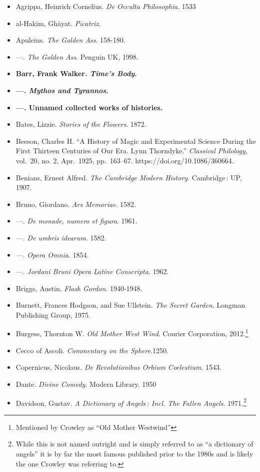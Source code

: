\documentclass[12pt]{article}
\providecommand{\tightlist}{%
  \setlength{\itemsep}{0pt}\setlength{\parskip}{0pt}}
\begin{document}
\begin{itemize}
\tightlist
\item
  Agrippa, Heinrich Cornelius. \emph{De Occulta Philosophia}. 1533
\item
  al-Hakīm, Ghāyat. \emph{Picatrix}.
\item
  Apuleius. \emph{The Golden Ass}. 158-180.
\item
  ---. \emph{The Golden Ass}. Penguin UK, 1998.
\item
  \textbf{Barr, Frank Walker. \emph{Time's Body}.}
\item
  \textbf{---. \emph{Mythos and Tyrannos}.}
\item
  \textbf{---. Unnamed collected works of histories.}
\item
  Bates, Lizzie. \emph{Stories of the Flowers}. 1872.
\item
  Beeson, Charles H. ``A History of Magic and Experimental Science During the First Thirteen Centuries of Our Era. Lynn Thorndyke.'' \emph{Classical Philology}, vol.~20, no. 2, Apr.~1925, pp.~163--67. https://doi.org/10.1086/360664.
\item
  Benians, Ernest Alfred. \emph{The Cambridge Modern History}. Cambridge\,: UP, 1907.
\item
  Bruno, Giordano. \emph{Ars Memoriae}. 1582.
\item
  ---. \emph{De monade, numero et figura}. 1961.
\item
  ---. \emph{De umbris idearum}. 1582.
\item
  ---. \emph{Opera Omnia}. 1854.
\item
  ---. \emph{Jordani Bruni Opera Latine Conscripta}. 1962.
\item
  Briggs, Austin. \emph{Flash Gordon}. 1940-1948.
\item
  Burnett, Frances Hodgson, and Sue Ullstein. \emph{The Secret Garden}. Longman Publishing Group, 1975.
\item
  Burgess, Thornton W. \emph{Old Mother West Wind}. Courier Corporation, 2012.\footnote{Mentioned by Crowley as ``Old Mother Westwind''}
\item
  Cecco of Ascoli. \emph{Commentary on the Sphere}.1250.
\item
  Copernicus, Nicolaus. \emph{De Revolutionibus Orbium Coelestium}. 1543.
\item
  Dante. \emph{Divine Comedy}. Modern Library. 1950
\item
  Davidson, Gustav. \emph{A Dictionary of Angels\,: Incl. The Fallen Angels}. 1971.\footnote{While this is not named outright and is simply referred to as ``a dictionary of angels'' it is by far the most famous published prior to the 1980s and is likely the one Crowley was referring to.}

\end{itemize}
\end{document}
